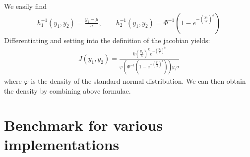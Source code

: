We easily find
\begin{align}
    h_1^{-1}(y_1, y_2) = \frac{y_1-\mu}{\sigma}, \qquad 
    h_2^{-1}(y_1, y_2) = \Phi^{-1}\left(1-e^{-\left(\frac{y_2}{\lambda}\right)^k}\right) 
\end{align}
Differentiating and setting into the definition of the jacobian yields:
\begin{align}
    J(y_1, y_2) = \frac{k\left(\frac{y_2}{\lambda}\right)^ke^{-\left(\frac{y_2}{\lambda}\right)^k}}{\varphi\left(\Phi^{-1}\left(1-e^{-\left(\frac{y_2}{\lambda}\right)^k}\right)\right)y_2\sigma }    
\end{align}
where $\varphi$ is the density of the standard normal distribution. We can then obtain the density by combining above formulae.
\newpage
\section{Benchmark for various implementations}\label{sourceCodeImplementation}
